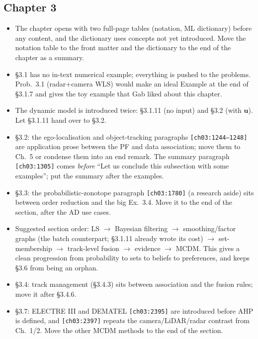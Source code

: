 \documentclass[10pt,a4paper]{article}
\newcommand{\src}[1]{{\footnotesize\texttt{[#1]}}}
\begin{document}
\subsection*{Chapter 3}
\begin{itemize}
\item The chapter opens with two full-page tables (notation, ML dictionary) before any content, and the dictionary uses concepts not yet introduced. Move the notation table to the front matter and the dictionary to the end of the chapter as a summary.
\item \S3.1 has no in-text numerical example; everything is pushed to the problems. Prob.~3.1 (radar+camera WLS) would make an ideal Example at the end of \S3.1.7 and gives the toy example that Gab liked about this chapter.
\item The dynamic model is introduced twice: \S3.1.11 (no input) and \S3.2 (with $\mathbf{u}$). Let \S3.1.11 hand over to \S3.2.
\item \S3.2: the ego-localisation and object-tracking paragraphs \src{ch03:1244--1248} are application prose between the PF and data association; move them to Ch.~5 or condense them into an end remark. The summary paragraph \src{ch03:1305} comes \emph{before} ``Let us conclude this subsection with some examples''; put the summary after the examples.
\item \S3.3: the probabilistic-zonotope paragraph \src{ch03:1780} (a research aside) sits between order reduction and the big Ex.~3.4. Move it to the end of the section, after the AD use cases.
\item Suggested section order: LS $\to$ Bayesian filtering $\to$ smoothing/factor graphs (the batch counterpart; \S3.1.11 already wrote its cost) $\to$ set-membership $\to$ track-level fusion $\to$ evidence $\to$ MCDM. This gives a clean progression from probability to sets to beliefs to preferences, and keeps \S3.6 from being an orphan.
\item \S3.4: track management (\S3.4.3) sits between association and the fusion rules; move it after \S3.4.6.
\item \S3.7: ELECTRE III and DEMATEL \src{ch03:2395} are introduced before AHP is defined, and \src{ch03:2397} repeats the camera/LiDAR/radar contrast from Ch.~1/2. Move the other MCDM methods to the end of the section.
\end{itemize}
\end{document}
